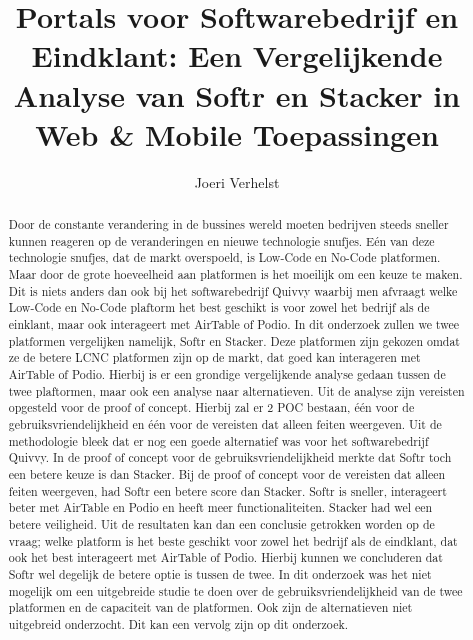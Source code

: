 \documentclass{hogent-article}
\title{Portals voor Softwarebedrijf en Eindklant: Een Vergelijkende Analyse van Softr en Stacker in Web \& Mobile Toepassingen}
\author{Joeri Verhelst}
\begin{document}
\begin{abstract}
  Door de constante verandering in de bussines wereld moeten bedrijven steeds sneller kunnen reageren op de veranderingen en nieuwe technologie snufjes. Eén van deze technologie snufjes, dat de markt overspoeld, is
  Low-Code en No-Code platformen. Maar door de grote hoeveelheid aan platformen is het moeilijk om een keuze te maken. Dit is niets anders dan ook bij het softwarebedrijf Quivvy waarbij men afvraagt welke Low-Code en No-Code plaftorm
  het best geschikt is voor zowel het bedrijf als de einklant, maar ook interageert met AirTable of Podio. In dit onderzoek zullen we twee platformen vergelijken namelijk, Softr en Stacker. Deze platformen zijn gekozen omdat ze de betere LCNC platformen zijn
  op de markt, dat goed kan interageren met AirTable of Podio. Hierbij is er een grondige vergelijkende analyse gedaan tussen de twee plaftormen, maar ook een analyse naar alternatieven. Uit de analyse zijn vereisten opgesteld voor de proof of concept.
  Hierbij zal er 2 POC bestaan, één voor de gebruiksvriendelijkheid en één voor de vereisten dat alleen feiten weergeven. Uit de methodologie bleek dat er nog een goede alternatief was voor het softwarebedrijf Quivvy. In de proof of concept voor de gebruiksvriendelijkheid
  merkte dat Softr toch een betere keuze is dan Stacker. Bij de proof of concept voor de vereisten dat alleen feiten weergeven, had Softr een betere score dan Stacker. Softr is sneller, interageert beter met AirTable en Podio en heeft meer functionaliteiten. Stacker had wel 
  een betere veiligheid. Uit de resultaten kan dan een conclusie getrokken worden op de vraag; welke platform is het beste geschikt voor zowel het bedrijf als de eindklant, dat ook het best interageert met AirTable of Podio. Hierbij kunnen we concluderen dat Softr wel degelijk de betere optie 
  is tussen de twee. In dit onderzoek was het niet mogelijk om een uitgebreide studie te doen over de gebruiksvriendelijkheid van de twee platformen en de capaciteit van de platformen. Ook zijn de alternatieven niet uitgebreid onderzocht. Dit kan een vervolg zijn op dit onderzoek.
\end{abstract}

\tableofcontents



\printbibliography[heading=bibintoc]
\end{document}
